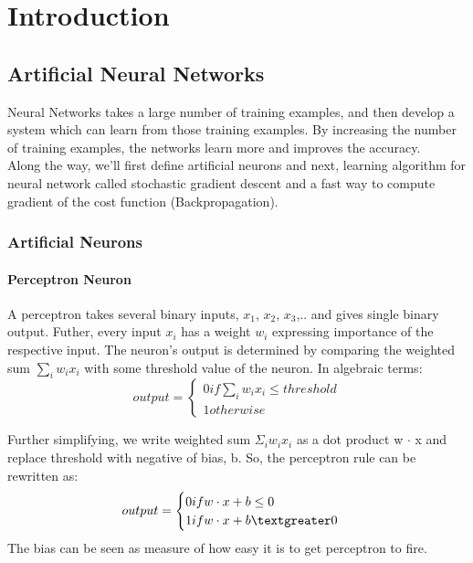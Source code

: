 \chapter{Introduction}


\section{Artificial Neural Networks}

	Neural Networks takes a large number of training examples, and then develop a system which can learn from those training examples. By increasing the number of training examples, the networks learn more and improves the accuracy.\\
	
	Along the way, we'll first define artificial neurons and next, learning algorithm for neural network called stochastic gradient descent and a fast way to compute gradient of the cost function (Backpropagation).

\subsection{Artificial Neurons}
\subsubsection{Perceptron Neuron}

	A perceptron takes several binary inputs, $x_1$, $x_2$, $x_3$,.. and gives single binary output. Futher, every input $x_i$ has a weight $w_i$ expressing importance of the respective input. The neuron's output is determined by comparing the weighted sum $\sum_{i} w_{i}x_{i}$ with some threshold value of the neuron. In algebraic terms:
	$$
	output=
	\begin{cases}
	0 if \sum_{i}w_{i}x_{i} \leq threshold \\
	1 otherwise
	\end{cases}
	$$
	
	Further simplifying, we write weighted sum $\Sigma_{i}w_{i}x_{i}$ as a dot product w $\cdot$ x and replace threshold with negative of bias, b. So, the perceptron rule can be rewritten as:
	$$
	output = 
	\begin{cases}
	0 if w \cdot x + b \leq 0\\
	1 if w \cdot x + b \textgreater 0
	\end{cases}
	$$
	The bias can be seen as measure of how easy it is to get perceptron to fire.
				
